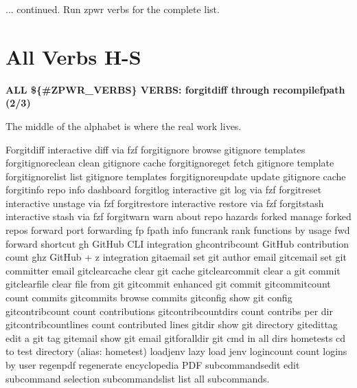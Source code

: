 \documentclass[11pt,a4paper,twoside]{book}
\begin{document}
... continued. Run zpwr verbs for the complete list.


\vspace{16pt}

\section{All Verbs H-S}


\vspace{10pt}
{\large\bfseries\color{neoncyan} ALL \$\{\#ZPWR\_VERBS\} VERBS: forgitdiff through recompilefpath (2/3)}\vspace{6pt}

The middle of the alphabet is where the real work lives.

Forgitdiff                 interactive diff via fzf forgitignore               browse gitignore templates forgitignoreclean          clean gitignore cache forgitignoreget            fetch gitignore template forgitignorelist           list gitignore templates forgitignoreupdate         update gitignore cache forgitinfo                 repo info dashboard forgitlog                  interactive git log via fzf forgitreset                interactive unstage via fzf forgitrestore              interactive restore via fzf forgitstash                interactive stash via fzf forgitwarn                 warn about repo hazards forked                     manage forked repos forward                    port forwarding fp                         fpath info funcrank                   rank functions by usage fwd                        forward shortcut gh                         GitHub CLI integration ghcontribcount             GitHub contribution count ghz                        GitHub + z integration gitaemail                  set git author email gitcemail                  set git committer email gitclearcache              clear git cache gitclearcommit             clear a git commit gitclearfile               clear file from git gitcommit                  enhanced git commit gitcommitcount             count commits gitcommits                 browse commits gitconfig                  show git config gitcontribcount            count contributions gitcontribcountdirs        count contribs per dir gitcontribcountlines       count contributed lines gitdir                     show git directory gitedittag                 edit a git tag gitemail                   show git email gitforalldir               git cmd in all dirs hometests                  cd to test directory (alias: hometest) loadjenv                   lazy load jenv logincount                 count logins by user regenpdf                   regenerate encyclopedia PDF subcommandsedit            edit subcommand selection subcommandslist             list all subcommands.
\end{document}
